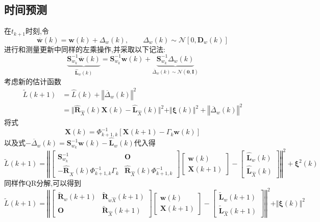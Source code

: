 \documentclass[cn,10pt,citestyle=gb7714-2015,bibstyle=gb7714-2015]{elegantbook}
\begin{document}
\subsection{时间预测}
在$t_{k+1}$时刻,令
\begin{equation}
  \overline{\bm{w}}(k)=\bm{w}(k)+\bm{\varDelta}_w(k),\qquad\bm{\varDelta}_w(k)\sim\mathcal{N}[0,\bm{D}_w(k)]
\end{equation}
进行和测量更新中同样的左乘操作,并采取以下记法:
\begin{equation}
  \underbrace{\bm{S}_{w_k}^{-1}\overline{\bm{w}}(k)}_{\hat{\bm{L}}_w(k)}=\bm{S}_{w_k}^{-1}\bm{w}(k)+\underbrace{\bm{S}_{w_k}^{-1}\bm{\varDelta}_w(k)}_{\overline{\bm{\varDelta}}_w(k)\sim\mathcal{N}(\bm{0},\bm{I})}
\end{equation}
考虑新的估计函数
\begin{align}
  \widetilde{L}(k+1)&=\hat{{L}}(k)+\left\Vert\overline{\bm{\varDelta}}_w(k)\right\Vert^2\\
  &=\Vert\hat{\bm{R}}_{\hat{X}}(k)\bm{X}(k)-\hat{\bm{L}}_{\hat{X}}(k)\Vert^2+\Vert\bm{\xi}(k)\Vert^2+\left\Vert\overline{\bm{\varDelta}}_w(k)\right\Vert^2
\end{align}
将式
\[
  \bm{X}(k)=\bm{\varPhi}_{k+1,k}^{-1}[\bm{X}(k+1)-\bm{\varGamma}_k\bm{w}(k)]
\]以及式$-\overline{\bm{\varDelta}}_w(k)=\bm{S}_{w_k}^{-1}\bm{w}(k)-\hat{\bm{L}}_w(k)$代入得
\begin{equation}
  \widetilde{L}(k+1)=\left\Vert\begin{bmatrix}
    \bm{S}_{w_k}^{-1}&\bm{O}\\
    -\hat{\bm{R}}_{\hat{X}}(k)\bm{\varPhi}_{k+1,k}^{-1}\bm{\varGamma}_k&\hat{\bm{R}}_{\hat{X}}(k)\bm{\varPhi}_{k+1,k}^{-1}
  \end{bmatrix}\begin{bmatrix}
    \bm{w}(k)\\
    \bm{X}(k+1)
  \end{bmatrix}-\begin{bmatrix}
    \hat{\bm{L}}_w(k)\\
    \hat{\bm{L}}_{\hat{X}}(k)
  \end{bmatrix}\right\Vert^2+\bm{\xi}^2(k)
\end{equation}
同样作QR分解,可以得到
\begin{equation}
  \widetilde{L}(k+1)=\left\Vert\begin{bmatrix}
    \widetilde{\bm{R}}_w(k+1)&\widetilde{\bm{R}}_{w\hat{X}}(k+1)\\
    \bm{O}&\widetilde{\bm{R}}_{\hat{X}}(k+1)
  \end{bmatrix}\begin{bmatrix}
    \bm{w}(k)\\
    \bm{X}(k+1)
  \end{bmatrix}-\begin{bmatrix}
    \widetilde{\bm{L}}_w(k+1)\\
    \widetilde{\bm{L}}_{\hat{X}}(k+1)
  \end{bmatrix}\right\Vert^2+\Vert\bm{\xi}(k)\Vert^2
\end{equation}
\end{document}
